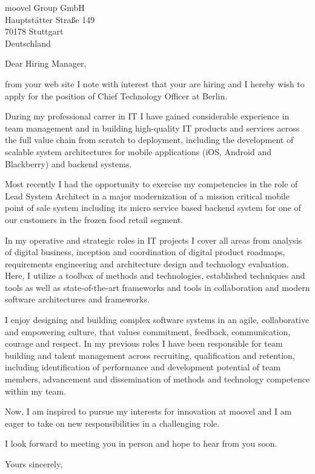 \documentclass[9pt,a4paper]{dinbrief}
\date{\today}
\begin{document}
 
\begin{letter}  
{%
	moovel Group GmbH\\
	Hauptstätter Straße 149\\
	70178 Stuttgart\\
	Deutschland
}
\subject{\bf Job Application CTO}
\opening{Dear Hiring Manager,}

from your web site I note with interest that your are hiring and I hereby wish to apply for the position of Chief Technology Officer at Berlin. 

During my professional carrer in IT I have gained considerable experience in team management and in building high-quality IT products and services across the full value chain from scratch to deployment, including the development of scalable system architectures for mobile applications (iOS, Android and Blackberry) and backend systems. 

Most recently I had the opportunity to exercise my competencies in the role of Lead System Architect in a major modernization of a mission critical mobile point of sale system including its micro service based backend system for one of our customers in the frozen food retail segment. 

In my operative and strategic roles in IT projects I cover all areas from analysis of digital business, inception and coordination of digital product roadmaps, requirements engineering and architecture design and technology evaluation. Here, I utilize a toolbox of methods and technologies, established techniques and tools as well as state-of-the-art frameworks and tools in collaboration and modern software architectures and frameworks.

I enjoy designing and building complex software systems in an agile, collaborative and empowering culture, that values commitment, feedback, communication, courage and respect. In my previous roles I have been responsible for team building and talent management across recruiting, qualification and retention, including identification of performance and development potential of team members, advancement and dissemination of methods and technology competence within my team.

Now, I am inspired to pursue my interests for innovation at moovel and I am eager to take on new responsibilities in a challenging role.

I look forward to meeting you in person and hope to hear from you soon.

\closing{Yours sincerely,}
\end{letter}
\end{document}
